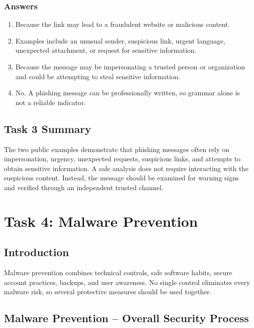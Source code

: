 \documentclass[12pt,a4paper]{article}
\begin{document}
\subsubsection*{Answers}

\begin{enumerate}
    \item Because the link may lead to a fraudulent website or malicious content.
    \item Examples include an unusual sender, suspicious link, urgent language, unexpected attachment, or request for sensitive information.
    \item Because the message may be impersonating a trusted person or organization and could be attempting to steal sensitive information.
    \item No. A phishing message can be professionally written, so grammar alone is not a reliable indicator.
\end{enumerate}

\subsection{Task 3 Summary}

The two public examples demonstrate that phishing messages often rely
on impersonation, urgency, unexpected requests, suspicious links, and
attempts to obtain sensitive information. A safe analysis does not
require interacting with the suspicious content. Instead, the message
should be examined for warning signs and verified through an
independent trusted channel.


\section{Task 4: Malware Prevention}

\subsection{Introduction}

Malware prevention combines technical controls, safe software habits,
secure account practices, backups, and user awareness. No single
control eliminates every malware risk, so several protective measures
should be used together.

\subsection{Malware Prevention -- Overall Security Process}
\end{document}
